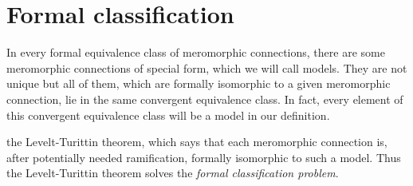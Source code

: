  

\begin{comment}
  \subsection{Ramification}
  \marginnote{\cite[I.5.4.1]{sabbah_cimpa90}}
\end{comment}

\section{Formal classification}\label{sec:formalClassification}
In every formal equivalence class of meromorphic connections, there are some
meromorphic connections of special form, which we will call models. They are
not unique but all of them, which are formally isomorphic to a given
meromorphic connection, lie in the same convergent equivalence class.
In fact, every element of this convergent equivalence class will be a model in
our definition.

 the Levelt-Turittin theorem, which says
that each meromorphic connection is, after potentially needed ramification,
formally isomorphic to such a model.
Thus the Levelt-Turittin theorem solves the \emph{formal classification
problem}.

